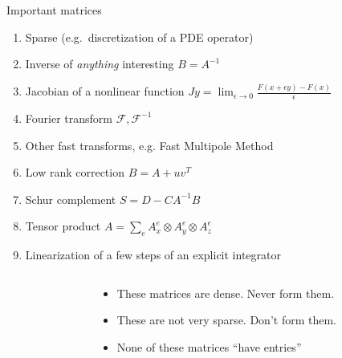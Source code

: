 \begin{frame}[t]{Important matrices}
  \begin{enumerate}
  \item Sparse (e.g.~discretization of a PDE operator)
  \item \alert<2,4>{Inverse of \emph{anything} interesting $B = A^{-1}$}
  \item \alert<4>{Jacobian of a nonlinear function $J y = \lim_{\epsilon \to 0} \frac{F(x + \epsilon y) - F(x)}{\epsilon}$}
  \item \alert<2,4>{Fourier transform $\mathcal{F},\mathcal{F}^{-1}$}
  \item \alert<2,4>{Other fast transforms, e.g. Fast Multipole Method}
  \item \alert<2,4>{Low rank correction $B = A + u v^T$}
  \item \alert<2,4>{Schur complement $S = D - C A^{-1} B$}
  \item \alert<3,4>{Tensor product $A = \sum_e A_x^e \otimes A_y^e \otimes A_z^e$}
  \item \alert<3,4>{Linearization of a few steps of an explicit integrator}
  \end{enumerate}
  \begin{columns}\begin{column}{0.2\textwidth}\end{column}\begin{column}{0.8\textwidth}
  \begin{itemize}
  \item<only@2> These matrices are \alert<2>{dense}.  Never form them.
  \item<only@3>{These are \alert<3>{not very sparse}.}
    Don't form them.
  \item<only@4> {None of these matrices ``have entries''}
  \end{itemize}
\end{column}
\end{columns}
\end{frame}
